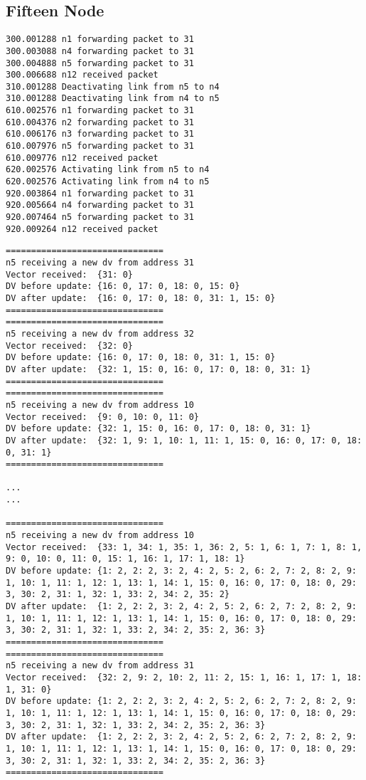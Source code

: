 \documentclass[11pt]{article}
\begin{document}
\subsection{Fifteen Node}




 \begin{lstlisting} 
300.001288 n1 forwarding packet to 31
300.003088 n4 forwarding packet to 31
300.004888 n5 forwarding packet to 31
300.006688 n12 received packet
310.001288 Deactivating link from n5 to n4
310.001288 Deactivating link from n4 to n5
610.002576 n1 forwarding packet to 31
610.004376 n2 forwarding packet to 31
610.006176 n3 forwarding packet to 31
610.007976 n5 forwarding packet to 31
610.009776 n12 received packet
620.002576 Activating link from n5 to n4
620.002576 Activating link from n4 to n5
920.003864 n1 forwarding packet to 31
920.005664 n4 forwarding packet to 31
920.007464 n5 forwarding packet to 31
920.009264 n12 received packet

\end{lstlisting}

 \begin{lstlisting} 
===============================
n5 receiving a new dv from address 31
Vector received:  {31: 0}
DV before update: {16: 0, 17: 0, 18: 0, 15: 0}
DV after update:  {16: 0, 17: 0, 18: 0, 31: 1, 15: 0}
===============================
===============================
n5 receiving a new dv from address 32
Vector received:  {32: 0}
DV before update: {16: 0, 17: 0, 18: 0, 31: 1, 15: 0}
DV after update:  {32: 1, 15: 0, 16: 0, 17: 0, 18: 0, 31: 1}
===============================
===============================
n5 receiving a new dv from address 10
Vector received:  {9: 0, 10: 0, 11: 0}
DV before update: {32: 1, 15: 0, 16: 0, 17: 0, 18: 0, 31: 1}
DV after update:  {32: 1, 9: 1, 10: 1, 11: 1, 15: 0, 16: 0, 17: 0, 18: 0, 31: 1}
===============================

...
...

===============================
n5 receiving a new dv from address 10
Vector received:  {33: 1, 34: 1, 35: 1, 36: 2, 5: 1, 6: 1, 7: 1, 8: 1, 9: 0, 10: 0, 11: 0, 15: 1, 16: 1, 17: 1, 18: 1}
DV before update: {1: 2, 2: 2, 3: 2, 4: 2, 5: 2, 6: 2, 7: 2, 8: 2, 9: 1, 10: 1, 11: 1, 12: 1, 13: 1, 14: 1, 15: 0, 16: 0, 17: 0, 18: 0, 29: 3, 30: 2, 31: 1, 32: 1, 33: 2, 34: 2, 35: 2}
DV after update:  {1: 2, 2: 2, 3: 2, 4: 2, 5: 2, 6: 2, 7: 2, 8: 2, 9: 1, 10: 1, 11: 1, 12: 1, 13: 1, 14: 1, 15: 0, 16: 0, 17: 0, 18: 0, 29: 3, 30: 2, 31: 1, 32: 1, 33: 2, 34: 2, 35: 2, 36: 3}
===============================
===============================
n5 receiving a new dv from address 31
Vector received:  {32: 2, 9: 2, 10: 2, 11: 2, 15: 1, 16: 1, 17: 1, 18: 1, 31: 0}
DV before update: {1: 2, 2: 2, 3: 2, 4: 2, 5: 2, 6: 2, 7: 2, 8: 2, 9: 1, 10: 1, 11: 1, 12: 1, 13: 1, 14: 1, 15: 0, 16: 0, 17: 0, 18: 0, 29: 3, 30: 2, 31: 1, 32: 1, 33: 2, 34: 2, 35: 2, 36: 3}
DV after update:  {1: 2, 2: 2, 3: 2, 4: 2, 5: 2, 6: 2, 7: 2, 8: 2, 9: 1, 10: 1, 11: 1, 12: 1, 13: 1, 14: 1, 15: 0, 16: 0, 17: 0, 18: 0, 29: 3, 30: 2, 31: 1, 32: 1, 33: 2, 34: 2, 35: 2, 36: 3}
===============================
\end{lstlisting}
\end{document}
